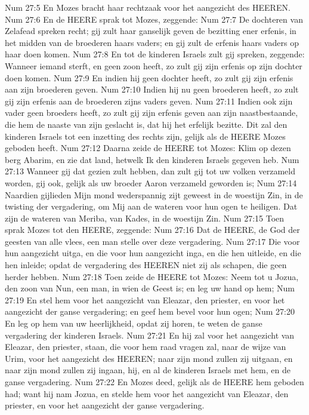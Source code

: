 Num 27:5  En Mozes bracht haar rechtzaak voor het aangezicht des HEEREN.
Num 27:6  En de HEERE sprak tot Mozes, zeggende:
Num 27:7  De dochteren van Zelafead spreken recht; gij zult haar ganselijk geven de bezitting ener erfenis, in het midden van de broederen haars vaders; en gij zult de erfenis haars vaders op haar doen komen.
Num 27:8  En tot de kinderen Israels zult gij spreken, zeggende: Wanneer iemand sterft, en geen zoon heeft, zo zult gij zijn erfenis op zijn dochter doen komen.
Num 27:9  En indien hij geen dochter heeft, zo zult gij zijn erfenis aan zijn broederen geven.
Num 27:10  Indien hij nu geen broederen heeft, zo zult gij zijn erfenis aan de broederen zijns vaders geven.
Num 27:11  Indien ook zijn vader geen broeders heeft, zo zult gij zijn erfenis geven aan zijn naastbestaande, die hem de naaste van zijn geslacht is, dat hij het erfelijk bezitte. Dit zal den kinderen Israels tot een inzetting des rechts zijn, gelijk als de HEERE Mozes geboden heeft.
Num 27:12  Daarna zeide de HEERE tot Mozes: Klim op dezen berg Abarim, en zie dat land, hetwelk Ik den kinderen Israels gegeven heb.
Num 27:13  Wanneer gij dat gezien zult hebben, dan zult gij tot uw volken verzameld worden, gij ook, gelijk als uw broeder Aaron verzameld geworden is;
Num 27:14  Naardien gijlieden Mijn mond wederspannig zijt geweest in de woestijn Zin, in de twisting der vergadering, om Mij aan de wateren voor hun ogen te heiligen. Dat zijn de wateren van Meriba, van Kades, in de woestijn Zin.
Num 27:15  Toen sprak Mozes tot den HEERE, zeggende:
Num 27:16  Dat de HEERE, de God der geesten van alle vlees, een man stelle over deze vergadering.
Num 27:17  Die voor hun aangezicht uitga, en die voor hun aangezicht inga, en die hen uitleide, en die hen inleide; opdat de vergadering des HEEREN niet zij als schapen, die geen herder hebben.
Num 27:18  Toen zeide de HEERE tot Mozes: Neem tot u Jozua, den zoon van Nun, een man, in wien de Geest is; en leg uw hand op hem;
Num 27:19  En stel hem voor het aangezicht van Eleazar, den priester, en voor het aangezicht der ganse vergadering; en geef hem bevel voor hun ogen;
Num 27:20  En leg op hem van uw heerlijkheid, opdat zij horen, te weten de ganse vergadering der kinderen Israels.
Num 27:21  En hij zal voor het aangezicht van Eleazar, den priester, staan, die voor hem raad vragen zal, naar de wijze van Urim, voor het aangezicht des HEEREN; naar zijn mond zullen zij uitgaan, en naar zijn mond zullen zij ingaan, hij, en al de kinderen Israels met hem, en de ganse vergadering.
Num 27:22  En Mozes deed, gelijk als de HEERE hem geboden had; want hij nam Jozua, en stelde hem voor het aangezicht van Eleazar, den priester, en voor het aangezicht der ganse vergadering.
